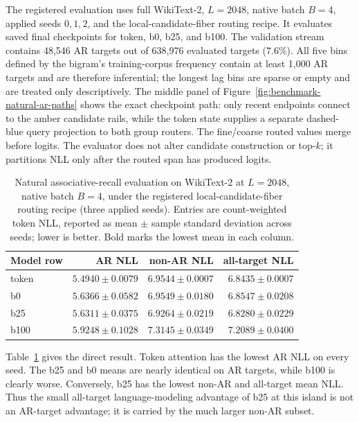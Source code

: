 \documentclass{article}
\theoremstyle{plain}
\theoremstyle{definition}
\theoremstyle{remark}
\begin{document}
The registered evaluation uses full WikiText-2, $L=2048$, native batch $B=4$,
applied seeds $0,1,2$, and the local-candidate-fiber routing recipe.  It evaluates
saved final checkpoints for token, b0, b25, and b100.  The validation stream
contains 48{,}546 AR targets out of 638{,}976 evaluated targets ($7.6\%$).
All five bins defined by the bigram's training-corpus frequency contain at
least 1{,}000 AR targets and are therefore inferential; the longest lag bins
are sparse or empty and are treated only descriptively.
The middle panel of Figure~\ref{fig:benchmark-natural-ar-paths} shows the exact
checkpoint path: only recent endpoints connect to the amber candidate rails,
while the token state supplies a separate dashed-blue query projection to both
group routers.  The fine/coarse routed values merge before logits.  The
evaluator does not alter candidate
construction or top-$k$; it partitions NLL only after the routed span has
produced logits.

\begin{table}[t]
\centering
\caption{Natural associative-recall evaluation on WikiText-2 at $L=2048$,
native batch $B=4$, under the registered local-candidate-fiber routing recipe
(three applied seeds).  Entries are count-weighted token NLL, reported as
mean $\pm$ sample standard deviation across seeds; lower is better.  Bold marks
the lowest mean in each column.}
\label{tab:mrp2-ar-hits}
\begin{tabular}{lrrr}
\toprule
Model row & AR NLL & non-AR NLL & all-target NLL \\
\midrule
token & $\mathbf{5.4940\pm0.0079}$ & $6.9544\pm0.0007$ & $6.8435\pm0.0007$ \\
b0 & $5.6366\pm0.0582$ & $6.9549\pm0.0180$ & $6.8547\pm0.0208$ \\
b25 & $5.6311\pm0.0375$ & $\mathbf{6.9264\pm0.0219}$ & $\mathbf{6.8280\pm0.0229}$ \\
b100 & $5.9248\pm0.1028$ & $7.3145\pm0.0349$ & $7.2089\pm0.0400$ \\
\bottomrule
\end{tabular}
\end{table}

Table~\ref{tab:mrp2-ar-hits} gives the direct result.  Token attention has the
lowest AR NLL on every seed.  The b25 and b0 means are nearly identical on AR
targets, while b100 is clearly worse.  Conversely, b25 has the lowest non-AR
and all-target mean NLL.  Thus the small all-target language-modeling advantage
of b25 at this island is not an AR-target advantage; it is carried by the
much larger non-AR subset.
\end{document}
